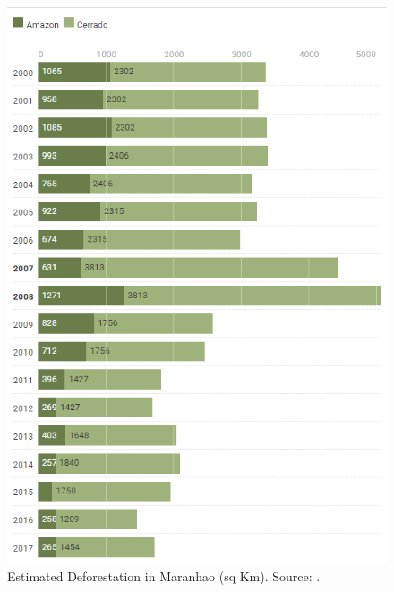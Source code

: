 \begin{figure}[H]
  \centering
  \includegraphics[width=1\textwidth, inner]{Chapter2/ChartMA_deforestation_chapter2.png}
\caption[Estimated Deforestation in Maranhao 2000-2017]{Estimated Deforestation in Maranhao (sq Km). Source: \citep{MMMAwebsite}.}
\label{fig:defAmazonMA}
\end{figure}


